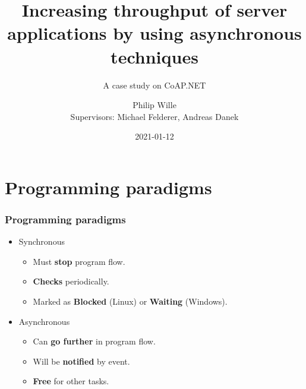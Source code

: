 \documentclass[11pt,t,usepdftitle=false,aspectratio=169,usenames,dvipsnames]{beamer}
\title[Initial presentation CoAP.NET]{Increasing throughput of server applications by using asynchronous techniques}
\subtitle{A case study on CoAP.NET}
\author{Philip Wille\\Supervisors: Michael Felderer, Andreas Danek}
\date{2021-01-12}
\begin{document}
    \maketitle
    \begin{frame}
        \vspace*{1cm plus 1fil}
        \tableofcontents
        \vspace*{0cm plus 1fil}
    \end{frame}
    
    \section{Programming paradigms}
    \begin{frame}
        \frametitle{Programming paradigms}
        \begin{itemize}
            \item<1-> Synchronous
            \begin{itemize}
                \item<3-> Must \textcolor{uibkblue}{\textbf{stop}} program flow.
                \item<5-> \textcolor{uibkblue}{\textbf{Checks}} periodically.
                \item<7-> Marked as \textcolor{uibkblue}{\textbf{Blocked}} (Linux) or \textcolor{uibkblue}{\textbf{Waiting}} (Windows).
            \end{itemize}
            \item<2-> Asynchronous
            \begin{itemize}
                \item<4-> Can \textcolor{uibkblue}{\textbf{go further}} in program flow.
                \item<6-> Will be \textcolor{uibkblue}{\textbf{notified}} by event.
                \item<8-> \textcolor{uibkblue}{\textbf{Free}} for other tasks.
            \end{itemize}
        \end{itemize}
    \end{frame}
\end{document}
